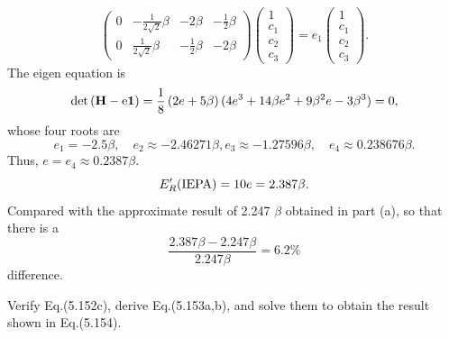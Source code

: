 \documentclass[a4paper]{book}
\newcounter{exercise}[chapter]
\newcounter{solution}[chapter]
\renewcommand\det[1]{\mathrm{det\left(#1\right)}}
\newcommand{\I}{{\bf 1}}
\newcommand{\HH}{{\bf H}}
\begin{document}
\begin{solution}
\begin{itemize}
\[\begin{pmatrix}
			0 & -\frac{1}{2\sqrt{2}} \beta & -2\beta & -\frac{1}{2} \beta \\
			0 & \frac{1}{2\sqrt{2}} \beta & -\frac{1}{2} \beta & -2\beta 
		\end{pmatrix} \begin{pmatrix}
			1 \\ c_1 \\ c_2 \\ c_3
		\end{pmatrix} = e_1 \begin{pmatrix}
			1 \\ c_1 \\ c_2 \\ c_3
		\end{pmatrix} .
	\]
	The eigen equation is
	\[
		\det{\HH - e \I} = \frac{1}{8} \left( 2e + 5 \beta \right) ( 4 e^3 + 14 \beta e^2 + 9 \beta^2 e - 3 \beta^3 ) = 0,
	\]
	whose four roots are
	\[
		e_1 = -2.5 \beta , \quad e_2 \approx -2.46271 \beta , e_3 \approx -1.27596 \beta , \quad e_4 \approx 0.238676 \beta.
	\]
	Thus, $e = e_4 \approx 0.2387 \beta.$
	\[
		E^\prime_R({\rm IEPA}) = 10 e = 2.387 \beta.
	\]
	Compared with the approximate result of 2.247 $\beta$ obtained in part (a), so that there is a
	\[
		\frac{ 2.387 \beta - 2.247 \beta }{ 2.247 \beta } = 6.2 \%
	\]
	 difference.
	 
	\end{itemize}		
	
	\end{solution}
	
	\begin{exercise}
	Verify Eq.(5.152c), derive Eq.(5.153a,b), and solve them to obtain the result shown in Eq.(5.154).
	\end{exercise}
	
\end{document}
